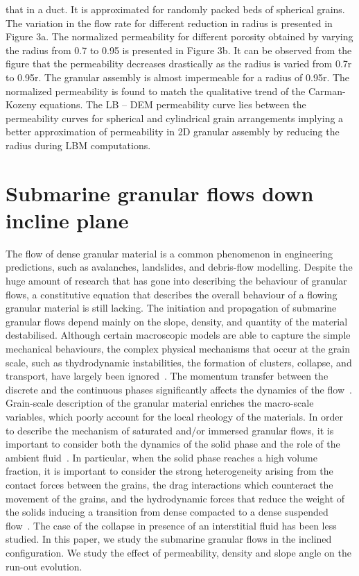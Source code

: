 that in a duct. It is approximated for randomly packed beds of spherical 
grains. The variation in the flow rate for different reduction in radius is 
presented in Figure 3a. The normalized permeability for different porosity 
obtained by varying the radius from 0.7 to 0.95 is presented in Figure 3b.
It can be observed from the figure that the permeability decreases drastically 
as the radius is varied from 0.7r to 0.95r. The granular assembly is almost 
impermeable for a radius of 0.95r. The normalized permeability is found to 
match the qualitative trend of the Carman-Kozeny equations. The LB – DEM 
permeability curve lies between the permeability curves for spherical and 
cylindrical grain arrangements implying a better approximation of permeability 
in 2D granular assembly by reducing the radius during LBM computations.
\section{Submarine granular flows down incline plane}



The flow of dense granular material is a common phenomenon in engineering 
predictions, such as avalanches, landslides, and debris-flow modelling. Despite 
the huge amount of research that has gone into describing the behaviour of 
granular flows, a constitutive equation that describes the overall behaviour of 
a flowing granular material is still lacking. The initiation and propagation of 
submarine granular flows depend mainly on the slope, density, and quantity of 
the material destabilised. Although certain macroscopic models are able to 
capture the simple mechanical behaviours, the complex physical mechanisms that 
occur at the grain scale, such as thydrodynamic instabilities, the formation of 
clusters, collapse, and transport, have largely been ignored~\citep{Topin2011}. 
The momentum transfer between the discrete and the continuous phases 
significantly affects the dynamics of the flow~\citep{Peker2007}. Grain-scale 
description of the granular material enriches the macro-scale variables,  which 
poorly account for the local rheology of the materials.  In order to describe 
the mechanism of saturated and/or immersed granular flows, it is important to 
consider both the dynamics of the solid phase and the role of the ambient 
fluid~\citep{Denlinger2001}. In particular, when the solid phase reaches a high 
volume fraction, it is important to consider the strong heterogeneity arising 
from the contact forces between the grains, the drag interactions which 
counteract the movement of the grains, and the hydrodynamic forces that reduce 
the weight of the solids inducing a transition from dense compacted to a dense 
suspended flow~\citep{Meruane2010}. The case of the collapse in presence of an 
interstitial fluid has been less studied. In this paper, we study the submarine 
granular flows in the inclined configuration. We study the effect of 
permeability, density and slope angle on the run-out evolution.



